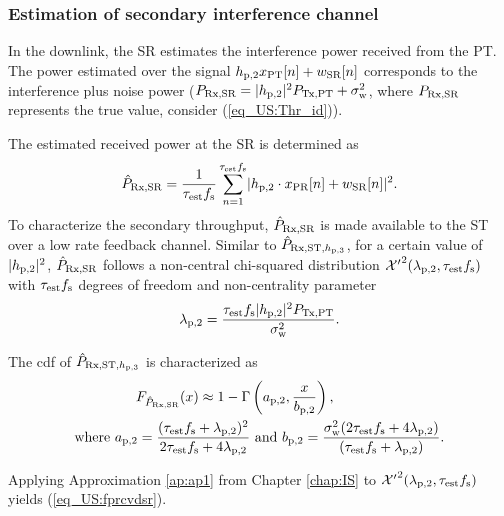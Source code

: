 \subsubsection{Estimation of secondary interference channel}
In the downlink, the SR estimates the interference power received from the PT. The power estimated over the signal $h_{\text{p,2}} x_{\text{PT}}[n] + w_{\text{SR}}[n]$ corresponds to the interference plus noise power ($P_{\text{Rx,SR}} = |h_{\text{p,2}}|^2 P_{\text{Tx,PT}} + \sigma^2_{\text{w}}$, where $P_{\text{Rx,SR}}$ represents the true value, consider (\ref{eq_US:Thr_id})). 

The estimated received power at the SR is determined as 
\begin{align}
\hat{P}_{\text{Rx,SR}} = {\frac{1}{{\tau_{\text{est}} f_{\text{s}}}}\sum_{n=1}^{\tau_{\text{est}} f_{\text{s}}}} {|h_{\text{p,2}} \cdot x_{\text{PR}}[n] + w_{\text{SR}}[n]|^2}. 
\label{eq_US:eprcvdsr}
\end{align}
To characterize the secondary throughput, $\hat{P}_{\text{Rx,SR}}$ is made available to the ST over a low rate feedback channel. Similar to $\hat{P}_{\text{Rx,ST,$h_{\text{p,3}}$}}$, for a certain value of $|h_{\text{p,2}}|^2$, $\hat{P}_{\text{Rx,SR}}$ follows a non-central chi-squared distribution $\ncchi2(\lpt, \test \fsam)$ with $\tau_{\text{est}} f_{\text{s}}$ degrees of freedom and non-centrality parameter \begin{align}
\lambda_{\text{p,2}} = \frac{\tau_{\text{est}} f_{\text{s}} |h_{\text{p,2}}|^2 P_{\text{Tx,PT}}}{\sigma^2_{\text{w}}}.
\label{eq_US:ncp_lpt}
\end{align}
\begin{lemma} \label{lm_US:lm3}
\normalfont
The cdf of $\hat{P}_{\text{Rx,ST,$h_{\text{p,3}}$}}$ is characterized as 
\begin{align}
F_{\hat{P}_{\text{Rx,SR}}}(x) \approx 1 - \Gamma&\left(a_{\text{p,2}}, \frac{x}{b_{\text{p,2}}}\right) \label{eq_US:fprcvdsr}, \\ 
\text{where  } a_{\text{p,2}} = \frac{(\tau_{\text{est}} f_{\text{s}} + \lambda_{\text{p,2}})^2}{2 \tau_{\text{est}} f_{\text{s}} + 4 \lambda_{\text{p,2}}} &\text{ and } b_{\text{p,2}} = \frac{\sigma^2_{\text{w}} (2 \tau_{\text{est}} f_{\text{s}} + 4 \lambda_{\text{p,2}})}{(\tau_{\text{est}} f_{\text{s}} + \lambda_{\text{p,2}})}.  \label{eq_US:para_pt} 
\end{align} 
\end{lemma}
\begin{IEEEproof}[Solution]
Applying Approximation \ref{ap:ap1} from Chapter \ref{chap:IS} to $\ncchi2(\lpt, \test \fsam)$ yields (\ref{eq_US:fprcvdsr}). 
\end{IEEEproof}



